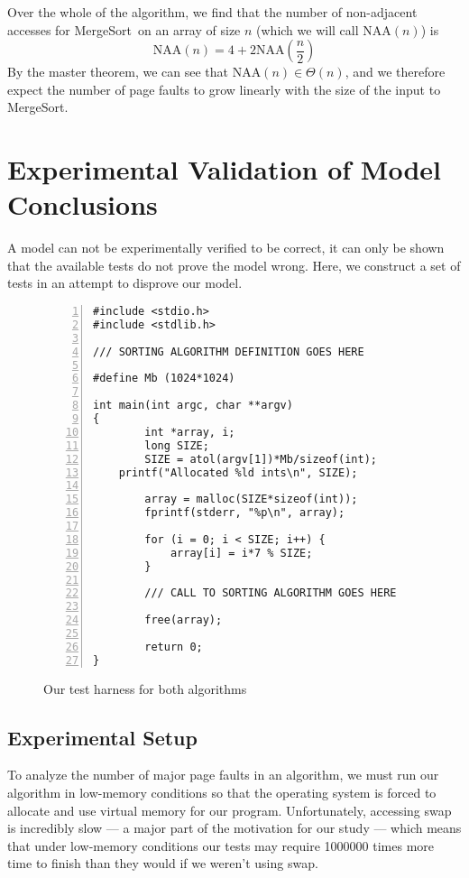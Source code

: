 \documentclass[11pt]{article}
\newcommand{\mergesort}{{\sc MergeSort}}
\newcommand{\NAA}{\textrm{NAA}}
\begin{document}
Over the whole of the algorithm, we find that the number of non-adjacent
accesses for \mergesort\ on an array of size $n$ (which we will call $\NAA(n)$)
is $$\NAA(n) = 4 + 2\NAA\left(\frac{n}{2}\right)$$ By the master theorem, we
can see that $\NAA(n) \in \Theta(n)$, and we therefore expect the number of
page faults to grow linearly with the size of the input to \mergesort.

\section{Experimental Validation of Model Conclusions} 
\label{experiment}

A model can not be experimentally verified to be correct, it can only be shown
that the available tests do not prove the model wrong.  Here, we construct a
set of tests in an attempt to disprove our model.

\begin{figure}
\begin{Verbatim}[numbers=left,numbersep=3pt,xleftmargin=20pt]
#include <stdio.h>
#include <stdlib.h>

/// SORTING ALGORITHM DEFINITION GOES HERE

#define Mb (1024*1024)

int main(int argc, char **argv)
{
        int *array, i;
        long SIZE;
        SIZE = atol(argv[1])*Mb/sizeof(int);
	printf("Allocated %ld ints\n", SIZE);

        array = malloc(SIZE*sizeof(int));
        fprintf(stderr, "%p\n", array);
        
        for (i = 0; i < SIZE; i++) {
            array[i] = i*7 % SIZE;
        }

        /// CALL TO SORTING ALGORITHM GOES HERE

        free(array);

        return 0;
}
\end{Verbatim}
\caption{Our test harness for both algorithms}
\label{fig:harness}
\end{figure}
\subsection{Experimental Setup}

To analyze the number of major page faults in an algorithm, we must run our
algorithm in low-memory conditions so that the operating system is forced to
allocate and use virtual memory for our program.  Unfortunately, accessing swap
is incredibly slow --- a major part of the motivation for our study --- which
means that under low-memory conditions our tests may require 1000000 times more
time to finish than they would if we weren't using swap.  
\end{document}

